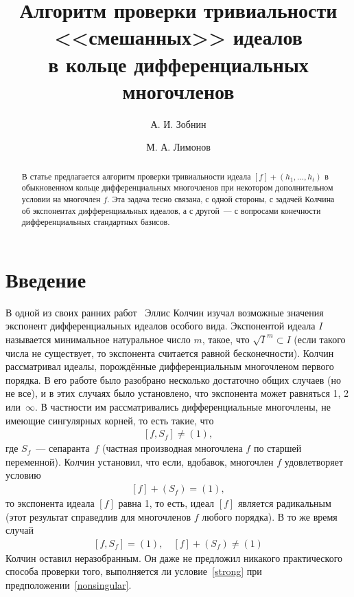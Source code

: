 \documentclass[11pt]{article}
\title{Алгоритм проверки тривиальности <<смешанных>> идеалов\\ в кольце дифференциальных многочленов}
\author{А. И. Зобнин \and М. А. Лимонов}
\theoremstyle{plain}
\theoremstyle{definition}
\theoremstyle{remark}
\begin{document}
\maketitle

\begin{abstract}
В статье предлагается алгоритм проверки тривиальности идеала
$[f] + (h_1, \ldots, h_t)$ в обыкновенном кольце дифференциальных многочленов
при некотором дополнительном условии на многочлен $f$.
Эта задача тесно связана, с одной стороны, с задачей Колчина об экспонентах дифференциальных идеалов,
а с другой~--- с вопросами конечности дифференциальных стандартных базисов.
\end{abstract}

\section{Введение}

В одной из своих ранних работ~\cite{Kolchin41} Эллис Колчин изучал возможные значения экспонент дифференциальных идеалов особого вида.
Экспонентой идеала $I$ называется минимальное натуральное число $m$, такое, что $\sqrt{I}^m\subset I$ (если такого числа не существует,
то экспонента считается равной бесконечности).
Колчин рассматривал идеалы, порождённые дифференциальным многочленом первого порядка.
В его работе было разобрано несколько достаточно общих случаев (но не все), и в этих случаях было установлено, что экспонента может равняться 1, 2 или~$\infty$.
В частности им рассматривались дифференциальные многочлены, не имеющие сингулярных корней, то есть такие, что
\begin{gather}
\label{nonsingular}
[f,S_f]\ne(1),
\end{gather}
где $S_f$~--- сепаранта~$f$ (частная производная многочлена $f$ по старшей переменной).
Колчин установил, что если, вдобавок, многочлен $f$ удовлетворяет условию
\begin{gather}
\label{strong}
[f]+(S_f)=(1),
\end{gather}
то экспонента идеала $[f]$ равна 1, то есть, идеал $[f]$ является радикальным (этот результат справедлив для многочленов $f$ любого порядка).
В то же время случай
\begin{gather}
\label{nontrivial}
[f, S_f] = (1), \quad [f] + (S_f) \ne (1)
\end{gather}
Колчин оставил неразобранным. Он даже не предложил никакого практического способа проверки того,
выполняется ли условие~\eqref{strong} при предположении~\eqref{nonsingular}.
\end{document}
